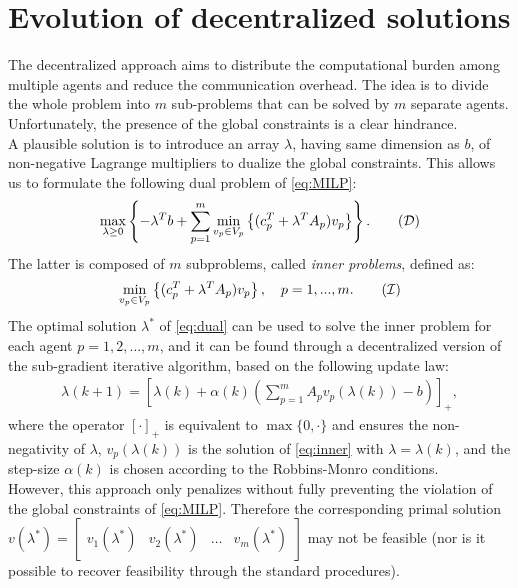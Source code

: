 \section{Evolution of decentralized solutions}
The decentralized approach aims to distribute the computational burden among multiple agents and reduce the communication overhead. The idea is to divide the whole problem into $m$ sub-problems that can be solved by $m$ separate agents.  Unfortunately, the presence of the global constraints is a clear hindrance. \\
A plausible solution is to introduce an array $\lambda$, having same dimension as $b$, of non-negative Lagrange multipliers to dualize the global constraints. This allows us to formulate the following dual problem of \ref{eq:MILP}:
\begin{align*}
    \max_{\lambda \geq 0} \left\{ -\lambda^T b + \sum_{p=1}^{m} \min_{v_p \in V_p} \left\{ (c_p^T + \lambda^T A_p) v_p \right\} \right\}. \tag{$\mathcal{D}$} \label{eq:dual}
\end{align*}
The latter is composed of $m$ subproblems, called \textit{inner problems}, defined as:
\begin{align}
    \min_{v_p \in V_p} \left\{ (c_p^T + \lambda^T A_p) v_p \right\}, \quad p = 1, ..., m. \tag{$\mathcal{I}$} \label{eq:inner}
\end{align}
The optimal solution $\lambda^*$ of \ref{eq:dual} can be used to solve the inner problem for each agent $p = 1, 2, \dots, m$, and it can be found through a decentralized version of the sub-gradient iterative algorithm, based on the following update law:
\begin{align}
    \lambda(k+1) = \left[\lambda(k) + \alpha(k) \left(\sum_{p=1}^m A_p v_p (\lambda(k)) - b\right)\right]_+, \label{eq:lambda}
\end{align}
where the operator $[\cdot]_+$ is equivalent to $\max\{0,\cdot\}$ and ensures the non-negativity of $\lambda$, $v_p (\lambda(k))$ is the solution of \ref{eq:inner} with $\lambda = \lambda(k)$, and the step-size $\alpha(k)$ is chosen according to the Robbins-Monro conditions\supercite{alpha}.\\
However, this approach only penalizes without fully preventing the violation of the global constraints of \ref{eq:MILP}. Therefore the corresponding primal solution $v(\lambda^*) = \begin{bmatrix}
        v_1(\lambda^*) & v_2(\lambda^*) & \dots & v_m(\lambda^*)
    \end{bmatrix}$ may not be feasible (nor is it possible to recover feasibility through the standard procedures\supercite{falsone}).\\




